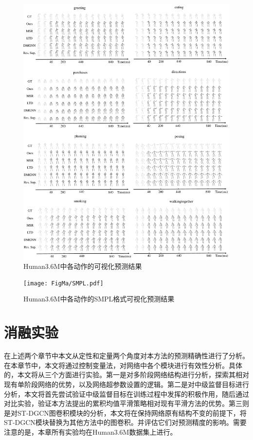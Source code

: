 \begin{figure}[ht]
    \centering
    \includegraphics[width=1\textwidth]{FigMa/more_result.pdf}
    \caption{Human3.6M中各动作的可视化预测结果}
    \label{fig:more_result}
\end{figure}

\begin{figure}[ht]
    \centering
    \texttt{[image: FigMa/SMPL.pdf]}
    \caption{Human3.6M中各动作的SMPL格式可视化预测结果}
    \label{fig:SMPL}
\end{figure}

\clearpage

\section{消融实验}
在上述两个章节中本文从定性和定量两个角度对本方法的预测精确性进行了分析。在本章节中，本文将通过控制变量法，对网络中各个模块进行有效性分析。具体的，本文将从三个方面进行实验。第一是对多阶段网络结构进行分析，探索其相对现有单阶段网络的优势，以及网络超参数设置的逻辑。第二是对中级监督目标进行分析，本文将首先尝试验证中级监督目标在训练过程中发挥的积极作用，随后通过对比实验，验证本方法提出的累积均值平滑策略相对现有平滑方法的优势。第三则是对ST-DGCN图卷积模块的分析，本文将在保持网络原有结构不变的前提下，将ST-DGCN模块替换为其他方法中的图卷积。并评估它们对预测精度的影响。需要注意的是，本章所有实验均在Human3.6M数据集上进行。
